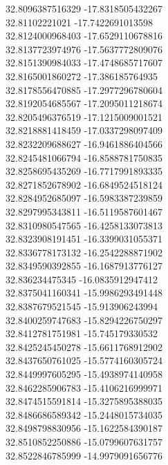 {32.8096387516329	-17.8318505432267\\
32.81102221021	-17.7422691013598\\
32.8124000968403	-17.6529110678816\\
32.8137723974976	-17.5637772809076\\
32.8151390984033	-17.4748685717607\\
32.8165001860272	-17.386185764935\\
32.8178556470885	-17.2977296780604\\
32.8192054685567	-17.2095011218674\\
32.8205496376519	-17.1215009001521\\
32.8218881418459	-17.0337298097409\\
32.8232209688627	-16.9461886404566\\
32.8245481066794	-16.8588781750835\\
32.8258695435269	-16.7717991893335\\
32.8271852678902	-16.6849524518124\\
32.8284952685097	-16.5983387239859\\
32.8297995343811	-16.5119587601467\\
32.8310980547565	-16.4258133073813\\
32.8323908191451	-16.3399031055371\\
32.8336778173132	-16.2542288871902\\
32.8349590392855	-16.1687913776127\\
32.836234475345	-16.0835912947412\\
32.8375041160341	-15.9986293491448\\
32.8387679521545	-15.913906243994\\
32.8400259747683	-15.8294226750297\\
32.8412781751981	-15.745179330532\\
32.8425245450278	-15.6611768912902\\
32.8437650761025	-15.5774160305724\\
32.8449997605295	-15.4938974140958\\
32.8462285906783	-15.4106216999971\\
32.8474515591814	-15.3275895388035\\
32.8486686589342	-15.2448015734035\\
32.8498798830956	-15.1622584390187\\
32.8510852250886	-15.0799607631757\\
32.8522846785999	-14.9979091656776\\
}
